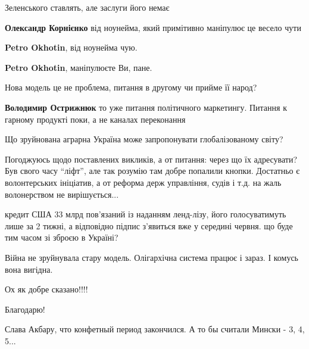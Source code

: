  
 
 
 
 
\qqSecCmt

\begin{itemize} %
Зеленського ставлять, але заслуги його немає

\begin{itemize} %
\textbf{Олександр Корнієнко} від ноунейма, який примітивно маніпулює це весело чути

\textbf{Petro Okhotin}, від ноунейма чую.

\textbf{Petro Okhotin}, маніпулюєте Ви, пане.

\end{itemize} %


Нова модель це не проблема, питання в другому чи прийме її народ?

\textbf{Володимир Острижнюк} то уже питання політичного маркетингу. Питання к гарному продукті поки, а не каналах переконання

Що зруйнована аграрна Україна може запропонувати глобалізованому світу?


Погоджуюсь щодо поставлених викликів, а от питання: через що їх адресувати? Був
свого часу \enquote{ліфт}, але так розумію там добре попалили кнопки. Достатньо є
волонтерських ініціатив, а от реформа держ управління, судів і т.д. на жаль
волонерством не вирішується...


кредит США 33 млрд пов'язаний із наданням ленд-лізу, його голосуватимуть лише
за 2 тижні, а відповідно підпис з'явиться вже у середині червня. що буде тим
часом зі зброєю в Україні?

Війна не зруйнувала стару модель. Олігархічна система працює і зараз. І комусь вона вигідна.

Ох як добре сказано!!!!

Благодарю!


Слава Акбару, что конфетный период закончился.
А то бы считали Мински - 3, 4, 5...

\end{itemize} %

